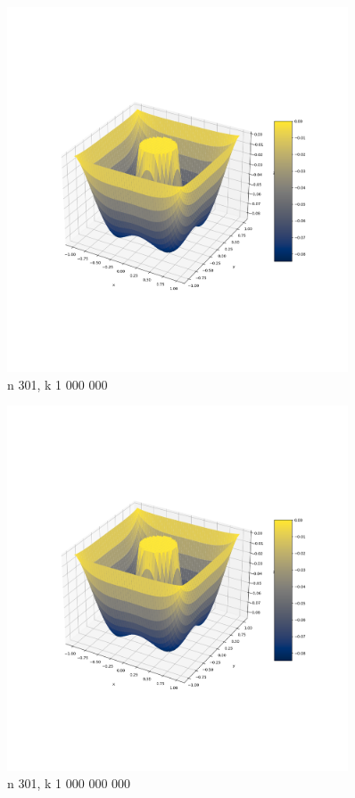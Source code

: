 \documentclass{article}
\begin{document}
    \begin{figure}[h]
        \centering
        \includegraphics[width=0.9\textwidth]{nal1_n301_k1e6.png}
        \caption{n 301, k 1 000 000}
    \end{figure}

    \begin{figure}[h]
        \centering
        \includegraphics[width=0.9\textwidth]{nal1_n301_k1e9.png}
        \caption{n 301, k 1 000 000 000}
    \end{figure}
\end{document}
